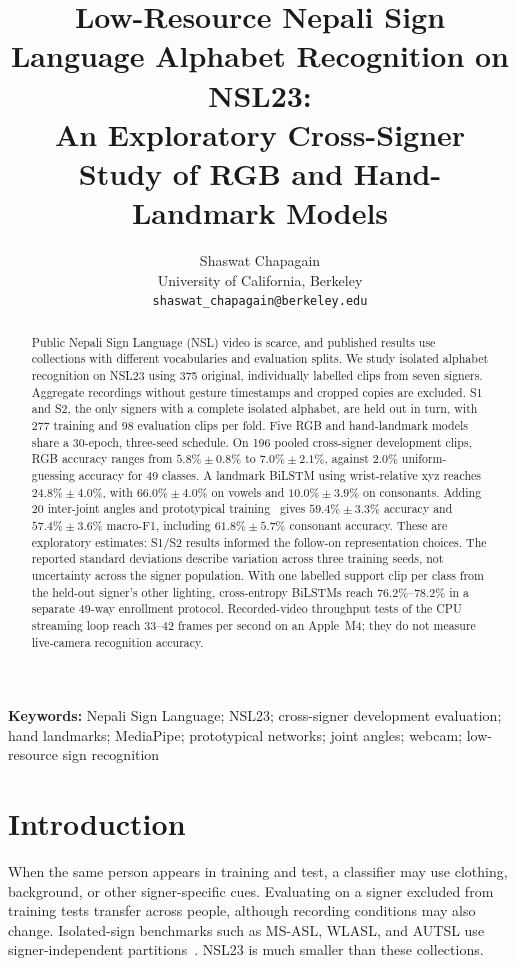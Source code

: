 \documentclass[11pt,a4paper]{article}
\title{Low-Resource Nepali Sign Language Alphabet Recognition on NSL23:\\
An Exploratory Cross-Signer Study of RGB and Hand-Landmark Models}
\author{Shaswat Chapagain\\
University of California, Berkeley\\
\texttt{shaswat\_chapagain@berkeley.edu}}
\date{}
\begin{document}
\maketitle

\begin{abstract}
Public Nepali Sign Language (NSL) video is scarce, and published results use collections with different vocabularies and evaluation splits. We study isolated alphabet recognition on NSL23 using 375 original, individually labelled clips from seven signers. Aggregate recordings without gesture timestamps and cropped copies are excluded. S1 and S2, the only signers with a complete isolated alphabet, are held out in turn, with 277 training and 98 evaluation clips per fold. Five RGB and hand-landmark models share a 30-epoch, three-seed schedule. On 196 pooled cross-signer development clips, RGB accuracy ranges from $5.8\% \pm 0.8\%$ to $7.0\% \pm 2.1\%$, against $2.0\%$ uniform-guessing accuracy for 49 classes. A landmark BiLSTM using wrist-relative xyz reaches $24.8\% \pm 4.0\%$, with $66.0\% \pm 4.0\%$ on vowels and $10.0\% \pm 3.9\%$ on consonants. Adding 20 inter-joint angles and prototypical training~\cite{snell2017prototypical,chamachot2026geometry} gives $59.4\% \pm 3.3\%$ accuracy and $57.4\% \pm 3.6\%$ macro-F1, including $61.8\% \pm 5.7\%$ consonant accuracy. These are exploratory estimates: S1/S2 results informed the follow-on representation choices. The reported standard deviations describe variation across three training seeds, not uncertainty across the signer population. With one labelled support clip per class from the held-out signer's other lighting, cross-entropy BiLSTMs reach $76.2\%$--$78.2\%$ in a separate 49-way enrollment protocol. Recorded-video throughput tests of the CPU streaming loop reach $33$--$42$ frames per second on an Apple~M4; they do not measure live-camera recognition accuracy.
\end{abstract}

\noindent\textbf{Keywords:} Nepali Sign Language; NSL23; cross-signer development evaluation; hand landmarks; MediaPipe; prototypical networks; joint angles; webcam; low-resource sign recognition

\section{Introduction}

When the same person appears in training and test, a classifier may use clothing, background, or other signer-specific cues. Evaluating on a signer excluded from training tests transfer across people, although recording conditions may also change. Isolated-sign benchmarks such as MS-ASL, WLASL, and AUTSL use signer-independent partitions~\cite{vaezi2019msasl,li2020wlasl,sincan2020autsl}. NSL23 is much smaller than these collections.
\end{document}
